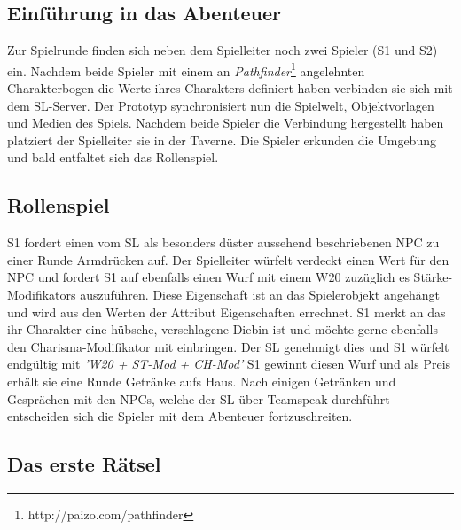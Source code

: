 \subsection{Einführung in das Abenteuer}
\label{sec:EinführungInDasAbenteuer}


Zur Spielrunde finden sich neben dem Spielleiter noch zwei Spieler (S1 und S2) ein. Nachdem beide Spieler mit einem an \emph{Pathfinder}\footnote{http://paizo.com/pathfinder} angelehnten Charakterbogen die Werte ihres Charakters definiert haben verbinden sie sich mit dem SL-Server. Der Prototyp synchronisiert nun die Spielwelt, Objektvorlagen und Medien des Spiels. Nachdem beide Spieler die Verbindung hergestellt haben platziert der Spielleiter sie in der Taverne.\newline
Die Spieler erkunden die Umgebung und bald entfaltet sich das Rollenspiel. 

\subsection{Rollenspiel}
\label{sec:Rollenspiel}

S1 fordert einen vom SL als besonders düster aussehend beschriebenen NPC zu einer Runde Armdrücken auf.\newline
Der Spielleiter würfelt verdeckt einen Wert für den NPC und fordert S1 auf ebenfalls einen Wurf mit einem W20 zuzüglich es Stärke-Modifikators auszuführen. Diese Eigenschaft ist an das Spielerobjekt angehängt und wird aus den Werten der Attribut Eigenschaften errechnet. S1 merkt an das ihr Charakter eine hübsche, verschlagene Diebin ist und möchte gerne ebenfalls den Charisma-Modifikator mit einbringen. Der SL genehmigt dies und S1 würfelt endgültig mit \emph{'W20 + ST-Mod + CH-Mod'} \newline
S1 gewinnt diesen Wurf und als Preis erhält sie eine Runde Getränke aufs Haus.\newline
Nach einigen Getränken und Gesprächen mit den NPCs, welche der SL über Teamspeak durchführt entscheiden sich die Spieler mit dem Abenteuer fortzuschreiten. 

\subsection{Das erste Rätsel}
\label{sec:DasErsteRätsel}

